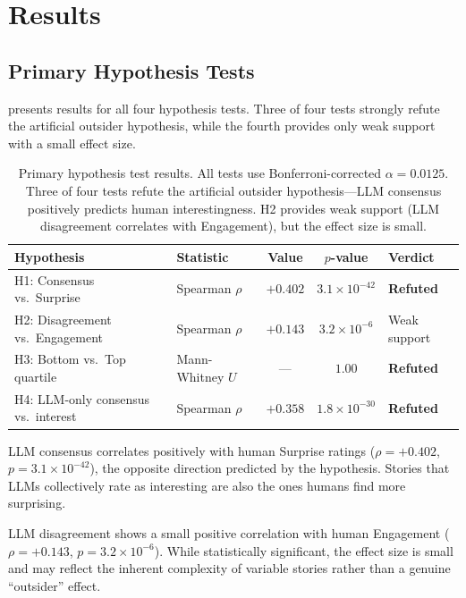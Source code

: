 \section{Results}
\label{sec:results}

\subsection{Primary Hypothesis Tests}
\label{sec:primary}

 presents results for all four hypothesis tests.
Three of four tests strongly refute the artificial outsider hypothesis, while the fourth provides only weak support with a small effect size.

\begin{table}[t]
    \centering
    \caption{Primary hypothesis test results. All tests use Bonferroni-corrected $\alpha = 0.0125$. Three of four tests refute the artificial outsider hypothesis---LLM consensus positively predicts human interestingness. H2 provides weak support (LLM disagreement correlates with Engagement), but the effect size is small.}
    \begin{tabular}{@{}llccl@{}}
        \toprule
        \textbf{Hypothesis} & \textbf{Statistic} & \textbf{Value} & \textbf{$p$-value} & \textbf{Verdict} \\
        \midrule
        H1: Consensus vs.\ Surprise & Spearman $\rho$ & $+0.402$ & $3.1 \times 10^{-42}$ & \textbf{Refuted} \\
        H2: Disagreement vs.\ Engagement & Spearman $\rho$ & $+0.143$ & $3.2 \times 10^{-6}$ & Weak support \\
        H3: Bottom vs.\ Top quartile & Mann-Whitney $U$ & --- & $1.00$ & \textbf{Refuted} \\
        H4: LLM-only consensus vs.\ interest & Spearman $\rho$ & $+0.358$ & $1.8 \times 10^{-30}$ & \textbf{Refuted} \\
        \bottomrule
    \end{tabular}
    \label{tab:hypotheses}
\end{table}

LLM consensus correlates positively with human Surprise ratings ($\rho = +0.402$, $p = 3.1 \times 10^{-42}$), the opposite direction predicted by the hypothesis.
Stories that LLMs collectively rate as interesting are also the ones humans find more surprising.

LLM disagreement shows a small positive correlation with human Engagement ($\rho = +0.143$, $p = 3.2 \times 10^{-6}$).
While statistically significant, the effect size is small and may reflect the inherent complexity of variable stories rather than a genuine ``outsider'' effect.

